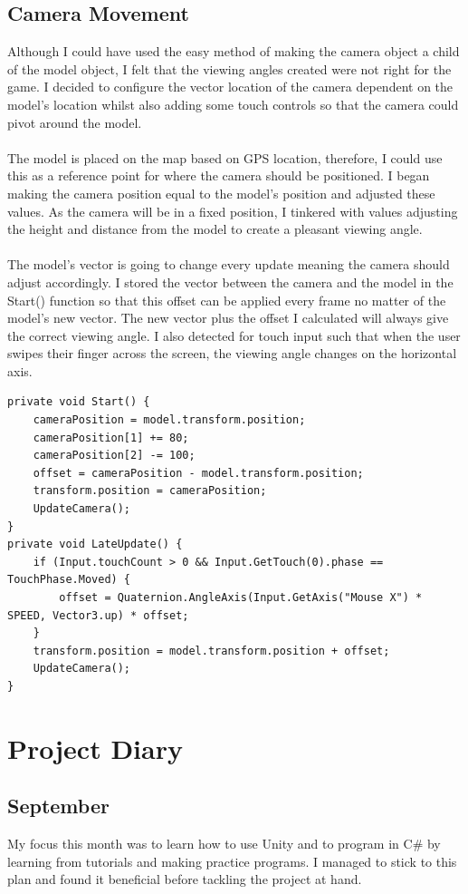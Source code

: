 \documentclass[a4paper]{report}
\begin{document}
\subsection{Camera Movement}
Although I could have used the easy method of making the camera object a child of the model object, I felt that the viewing angles created were not right for the game. I decided to configure the vector location of the camera dependent on the model’s location whilst also adding some touch controls so that the camera could pivot around the model.
\\\\
The model is placed on the map based on GPS location, therefore, I could use this as a reference point for where the camera should be positioned. I began making the camera position equal to the model's position and adjusted these values. As the camera will be in a fixed position, I tinkered with values adjusting the height and distance from the model to create a pleasant viewing angle.
\\\\ 
The model’s vector is going to change every update meaning the camera should adjust accordingly. I stored the vector between the camera and the model in the Start() function so that this offset can be applied every frame no matter of the model’s new vector. The new vector plus the offset I calculated will always give the correct viewing angle. I also detected for touch input such that when the user swipes their finger across the screen, the viewing angle changes on the horizontal axis.
\begin{Verbatim}[tabsize=4]
private void Start() {
	cameraPosition = model.transform.position;
	cameraPosition[1] += 80;
	cameraPosition[2] -= 100;
	offset = cameraPosition - model.transform.position;
	transform.position = cameraPosition;
	UpdateCamera();
}
private void LateUpdate() {
	if (Input.touchCount > 0 && Input.GetTouch(0).phase == TouchPhase.Moved) {
		offset = Quaternion.AngleAxis(Input.GetAxis("Mouse X") * SPEED, Vector3.up) * offset;
	}
	transform.position = model.transform.position + offset;
	UpdateCamera();
}
\end{Verbatim}
\section{Project Diary}
\subsection{September}
My focus this month was to learn how to use Unity and to program in C\# by learning from tutorials and making practice programs. I managed to stick to this plan and found it beneficial before tackling the project at hand.
\end{document}
